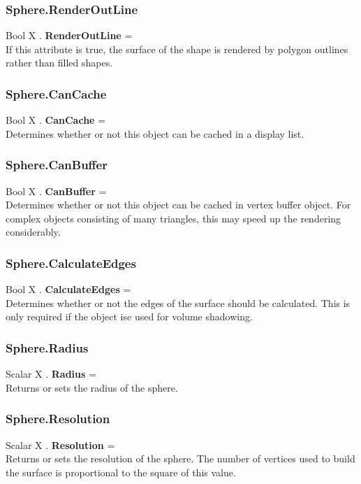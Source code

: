\documentclass[10pt]{book}
\begin{document}
\subsubsection{Sphere.RenderOutLine \label{F:Sphere:RenderOutLine}}
Bool X . \textbf{RenderOutLine} = \\
If this attribute is true, the surface of the shape is rendered by polygon outlines rather than filled shapes.

\subsubsection{Sphere.CanCache \label{F:Sphere:CanCache}}
Bool X . \textbf{CanCache} = \\
Determines whether or not this object can be cached in a display list.

\subsubsection{Sphere.CanBuffer \label{F:Sphere:CanBuffer}}
Bool X . \textbf{CanBuffer} = \\
Determines whether or not this object can be cached in vertex buffer object. For complex objects consisting of many triangles, this may speed up the rendering considerably.

\subsubsection{Sphere.CalculateEdges \label{F:Sphere:CalculateEdges}}
Bool X . \textbf{CalculateEdges} = \\
Determines whether or not the edges of the surface should be calculated. This is only required if the object ise used for volume shadowing.

\subsubsection{Sphere.Radius \label{F:Sphere:Radius}}
Scalar X . \textbf{Radius} = \\
Returns or sets the radius of the sphere.

\subsubsection{Sphere.Resolution \label{F:Sphere:Resolution}}
Scalar X . \textbf{Resolution} = \\
Returns or sets the resolution of the sphere. The number of vertices used to build the surface is proportional to the square of this value.
\end{document}
